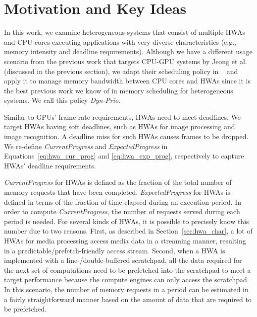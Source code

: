 \documentclass[10pt,letterpaper]{article}
\newcommand{\MODIFIED}[1]{#1}
\begin{document}
 \section{Motivation and Key Ideas}
\label{sec:motivation}

In this work, we examine heterogeneous systems that consist of multiple
HWAs and CPU cores executing applications with very diverse characteristics
(e.g., memory intensity and deadline requirements).
\MODIFIED{Although we have a different usage scenario from the previous work
that targets CPU-GPU systems by Jeong et al.~\cite{schedulingCPUGPU} (discussed
in the previous section), we adapt their scheduling policy in ~\cite{schedulingCPUGPU} and
apply it to manage memory bandwidth between CPU cores and HWAs since it
is the best previous work we know of in memory scheduling for heterogeneous systems.
We call this policy \emph{Dyn-Prio}.}



Similar to GPUs' frame rate requirements, HWAs need to meet
deadlines. We target HWAs having soft deadlines, such as HWAs for
image processing and image recognition. A deadline miss for such
HWAs causes frames to be dropped. We re-define
\emph{CurrentProgress} and \emph{ExpectedProgress} in
Equations~\ref{eq:hwa_cur_prog} and \ref{eq:hwa_exp_prog},
respectively to capture HWAs' deadline requirements.



\begin{small}
  
  
\end{small}

{\it CurrentProgress} for HWAs is defined as the fraction of the total
number of memory requests that have been completed. {\it ExpectedProgress} for
HWAs is defined in terms of the fraction of time elapsed during an
execution period.  \MODIFIED{In order to compute {\it CurrentProgress}, the
number of requests served during each period is needed. For several kinds of
HWAs, it is possible to precisely know this number due to two reasons. First,
as described in Section~\ref{sec:hwa_char}, a lot of HWAs for media processing
access media data in a streaming manner, resulting in a
predictable/prefetch-friendly access stream. Second, when a HWA is implemented
with a line-/double-buffered scratchpad, all the data required for the next
set of computations need to be prefetched into the scratchpad to meet a target
performance because the compute engines can only access the scratchpad. In
this scenario, the number of memory requests in a period can be
estimated in a fairly straightforward manner based on the amount of data that
are required to be prefetched.}
\end{document}
